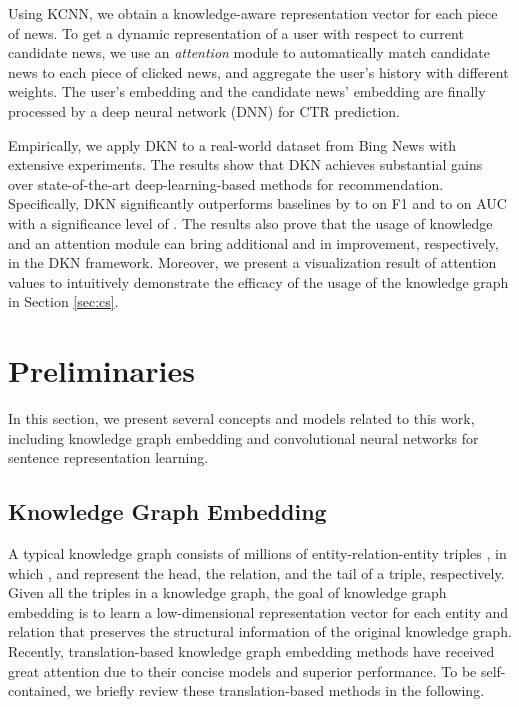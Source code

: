 \documentclass[sigconf]{acmart}
\begin{document}
	Using KCNN, we obtain a knowledge-aware representation vector for each piece of news.
	To get a dynamic representation of a user with respect to current candidate news, we use an \textit{attention} module to automatically match candidate news to each piece of clicked news, and aggregate the user's history with different weights.
	The user's embedding and the candidate news' embedding are finally processed by a deep neural network (DNN) for CTR prediction.
	
	Empirically, we apply DKN to a real-world dataset from Bing News with extensive experiments.
	The results show that DKN achieves substantial gains over state-of-the-art deep-learning-based methods for recommendation.
	Specifically, DKN significantly outperforms baselines by  to  on F1 and  to  on AUC with a significance level of .
	The results also prove that the usage of knowledge and an attention module can bring additional  and  in improvement, respectively, in the DKN framework.
	Moreover, we present a visualization result of attention values to intuitively demonstrate the efficacy of the usage of the knowledge graph in Section \ref{sec:cs}.



\section{Preliminaries}
	In this section, we present several concepts and models related to this work, including knowledge graph embedding and convolutional neural networks for sentence representation learning.
	
	\subsection{Knowledge Graph Embedding}
	\label{sec:kge}
		A typical knowledge graph consists of millions of entity-relation-entity triples , in which ,  and  represent the head, the relation, and the tail of a triple, respectively.
Given all the triples in a knowledge graph, the goal of knowledge graph embedding is to learn a low-dimensional representation vector for each entity and relation that preserves the structural information of the original knowledge graph.
		Recently, translation-based knowledge graph embedding methods have received great attention due to their concise models and superior performance.
		To be self-contained, we briefly review these translation-based methods in the following.
		
\end{document}
